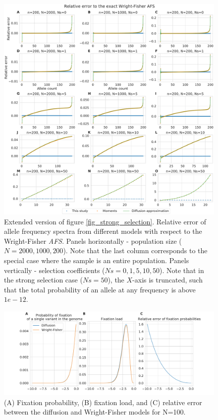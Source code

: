 \documentclass[9pt,twocolumn,twoside,lineno]{gsajnl}
\begin{document}
\begin{figure}
  \centering
  \includegraphics[width=\columnwidth]{fig/afs_comp_big.pdf}

    \caption{Extended version of figure \ref{fig_strong_selection}. Relative error of allele
    frequency spectra from different models with respect to the Wright-Fisher \textit{AFS}. Panels
    horizontally - population size ($N=2000,1000,200$). Note that the last column corresponds to the
    special case where the sample is an entire population. Panels vertically - selection
    coefficients ($Ns=0,1,5,10,50$). Note that in the strong selection case ($Ns=50$), the $X$-axis
    is truncated, such that the total probability of an allele at any frequency is above $1e-12$.
    }

  \label{fig_apx_strong_selection_extended}
\end{figure}

\begin{figure}
  \centering
  \includegraphics[width=\columnwidth]{fig/fixation_rate_N_100.pdf}

    \caption{(A) Fixation probability, (B) fixation load, and (C) relative error between the
    diffusion and Wright-Fisher models for N=100.}

  \label{fig_apx_fixation_100}

\end{figure}
\end{document}
